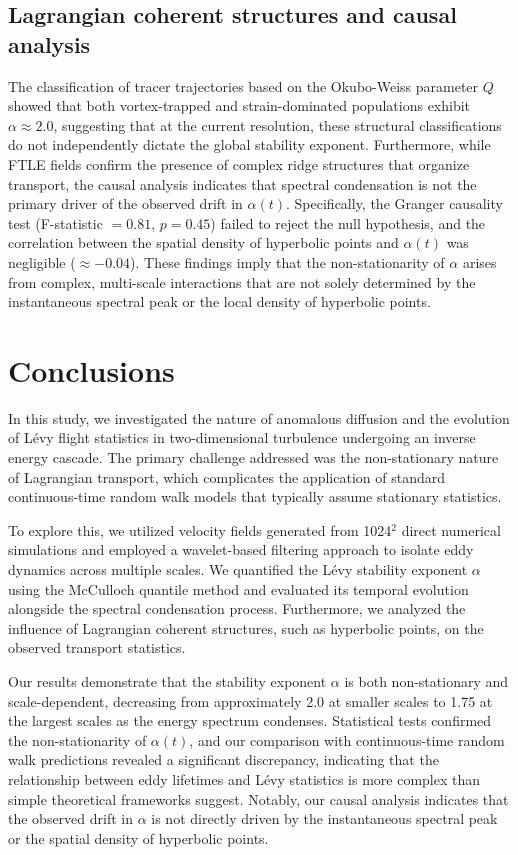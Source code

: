 \documentclass[]{article}
\begin{document}
\subsection{Lagrangian coherent structures and causal analysis}
The classification of tracer trajectories based on the Okubo-Weiss parameter $Q$ showed that both vortex-trapped and strain-dominated populations exhibit $\alpha \approx 2.0$, suggesting that at the current resolution, these structural classifications do not independently dictate the global stability exponent. Furthermore, while FTLE fields confirm the presence of complex ridge structures that organize transport, the causal analysis indicates that spectral condensation is not the primary driver of the observed drift in $\alpha(t)$. Specifically, the Granger causality test (F-statistic $= 0.81$, $p = 0.45$) failed to reject the null hypothesis, and the correlation between the spatial density of hyperbolic points and $\alpha(t)$ was negligible ($\approx -0.04$). These findings imply that the non-stationarity of $\alpha$ arises from complex, multi-scale interactions that are not solely determined by the instantaneous spectral peak or the local density of hyperbolic points.

\section{Conclusions}
\label{sec:conclusions}
In this study, we investigated the nature of anomalous diffusion and the evolution of Lévy flight statistics in two-dimensional turbulence undergoing an inverse energy cascade. The primary challenge addressed was the non-stationary nature of Lagrangian transport, which complicates the application of standard continuous-time random walk models that typically assume stationary statistics.

To explore this, we utilized velocity fields generated from 1024$^2$ direct numerical simulations and employed a wavelet-based filtering approach to isolate eddy dynamics across multiple scales. We quantified the Lévy stability exponent $\alpha$ using the McCulloch quantile method and evaluated its temporal evolution alongside the spectral condensation process. Furthermore, we analyzed the influence of Lagrangian coherent structures, such as hyperbolic points, on the observed transport statistics.

Our results demonstrate that the stability exponent $\alpha$ is both non-stationary and scale-dependent, decreasing from approximately 2.0 at smaller scales to 1.75 at the largest scales as the energy spectrum condenses. Statistical tests confirmed the non-stationarity of $\alpha(t)$, and our comparison with continuous-time random walk predictions revealed a significant discrepancy, indicating that the relationship between eddy lifetimes and Lévy statistics is more complex than simple theoretical frameworks suggest. Notably, our causal analysis indicates that the observed drift in $\alpha$ is not directly driven by the instantaneous spectral peak or the spatial density of hyperbolic points.
\end{document}

